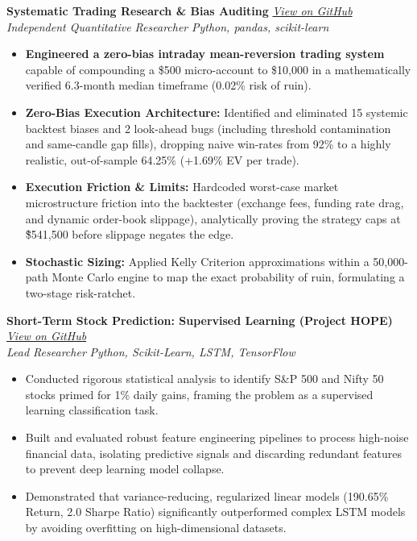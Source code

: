 \documentclass[10pt, letterpaper]{article}
\begin{document}
\noindent \textbf{Systematic Trading Research \& Bias Auditing} \hfill \href{https://github.com/Joeytribb/systematic-trading-research}{\textit{View on GitHub}} \\
\textit{Independent Quantitative Researcher} \hfill \textit{Python, pandas, scikit-learn}
\begin{itemize}[leftmargin=*, noitemsep, topsep=0pt]
    \item \textbf{Engineered a zero-bias intraday mean-reversion trading system} capable of compounding a \$500 micro-account to \$10,000 in a mathematically verified 6.3-month median timeframe (0.02\% risk of ruin).
    \item \textbf{Zero-Bias Execution Architecture:} Identified and eliminated 15 systemic backtest biases and 2 look-ahead bugs (including threshold contamination and same-candle gap fills), dropping naive win-rates from 92\% to a highly realistic, out-of-sample 64.25\% (+1.69\% EV per trade).
    \item \textbf{Execution Friction \& Limits:} Hardcoded worst-case market microstructure friction into the backtester (exchange fees, funding rate drag, and dynamic order-book slippage), analytically proving the strategy caps at \~\$541,500 before slippage negates the edge.
    \item \textbf{Stochastic Sizing:} Applied Kelly Criterion approximations within a 50,000-path Monte Carlo engine to map the exact probability of ruin, formulating a two-stage risk-ratchet.
\end{itemize}
\vspace{6pt}

\noindent \textbf{Short-Term Stock Prediction: Supervised Learning (Project HOPE)} \hfill \href{https://github.com/Joeytribb/HOPE}{\textit{View on GitHub}} \\
\textit{Lead Researcher} \hfill \textit{Python, Scikit-Learn, LSTM, TensorFlow}
\begin{itemize}[leftmargin=*, noitemsep, topsep=0pt]
    \item Conducted rigorous statistical analysis to identify S\&P 500 and Nifty 50 stocks primed for 1\% daily gains, framing the problem as a supervised learning classification task.
    \item Built and evaluated robust feature engineering pipelines to process high-noise financial data, isolating predictive signals and discarding redundant features to prevent deep learning model collapse.
    \item Demonstrated that variance-reducing, regularized linear models (190.65\% Return, 2.0 Sharpe Ratio) significantly outperformed complex LSTM models by avoiding overfitting on high-dimensional datasets.
\end{itemize}
\vspace{6pt}
\end{document}
